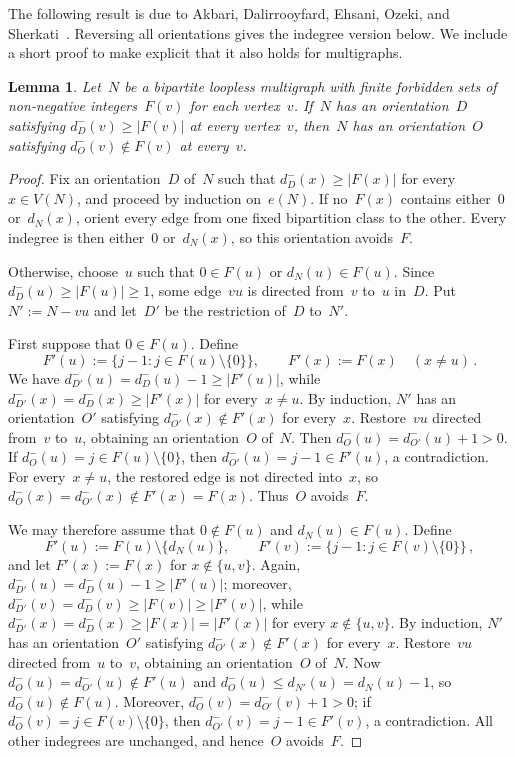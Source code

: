 \documentclass[12pt,reqno,a4paper]{amsart}
\newtheorem{lemma}[theorem]{Lemma}
\begin{document}
The following result is due to Akbari, Dalirrooyfard, Ehsani, Ozeki, and
Sherkati~\cite[Lemma~11 in the authors' preprint]{AkDaEhOzSh20}.
Reversing all orientations gives the indegree version below.
We include a short proof to make explicit that it also holds for multigraphs.

\begin{lemma}\label{lem:lists} 
  Let~$N$ be a bipartite loopless multigraph with finite forbidden sets of
  non-negative integers~$F(v)$ for each vertex~$v$.
  If~$N$ has an orientation~$D$ satisfying $d^-_D(v) \ge |F(v)|$ at every
  vertex~$v$, then~$N$ has an orientation~$O$ satisfying $d^-_O(v) \notin F(v)$
  at every~$v$.
\end{lemma}
\begin{proof}
  Fix an orientation~$D$ of~$N$ such that $d^-_D(x) \ge |F(x)|$ for every~$x
  \in V(N)$, and proceed by induction on~$e(N)$. 
  If no~$F(x)$ contains either~$0$ or~$d_N(x)$, orient every edge from one
  fixed bipartition class to the other. 
  Every indegree is then either~$0$ or~$d_N(x)$, so this orientation
  avoids~$F$.

  Otherwise, choose~$u$ such that $0 \in F(u)$ or $d_N(u) \in F(u)$. 
  Since $d^-_D(u) \ge |F(u)| \ge 1$, some edge~$vu$ is directed from~$v$ to~$u$
  in~$D$.
  Put $N' := N - vu$ and let~$D'$ be the restriction of~$D$ to~$N'$.

  First suppose that $0 \in F(u)$. 
  Define
  \[
    F'(u) := \{j-1 \colon j \in F(u) \setminus \{0\}\},
            \qquad F'(x) := F(x) \quad (x \neq u) \, .
  \]
  We have $d^-_{D'}(u) = d^-_D(u) - 1 \ge |F'(u)|$, while $d^-_{D'}(x) =
  d^-_D(x) \ge |F'(x)|$ for every~$x \neq u$.
  By induction, $N'$ has an orientation~$O'$ satisfying $d^-_{O'}(x) \notin
  F'(x)$ for every~$x$.
  Restore~$vu$ directed from~$v$ to~$u$, obtaining an orientation~$O$ of~$N$.
  Then $d^-_O(u) = d^-_{O'}(u) + 1 > 0$.
  If $d^-_O(u) = j \in F(u) \setminus \{0\}$, then $d^-_{O'}(u) = j-1 \in
  F'(u)$, a contradiction. 
  For every~$x \neq u$, the restored edge is not directed into~$x$, so
  $d^-_O(x) = d^-_{O'}(x) \notin F'(x) = F(x)$.
  Thus~$O$ avoids~$F$.

  We may therefore assume that $0 \notin F(u)$ and $d_N(u) \in F(u)$.
  Define
  \[
    F'(u) := F(u) \setminus \{d_N(u)\}, \qquad
    F'(v) := \{j-1 \colon j \in F(v) \setminus \{0\}\} \, ,
  \]
  and let $F'(x) := F(x)$ for $x \notin \{u,v\}$.
  Again, $d^-_{D'}(u) = d^-_D(u)-1 \ge |F'(u)|$; moreover, $d^-_{D'}(v) =
  d^-_D(v) \ge |F(v)| \ge |F'(v)|$, while $d^-_{D'}(x) = d^-_D(x) \ge |F(x)| =
  |F'(x)|$ for every $x \notin \{u,v\}$.
  By induction, $N'$ has an orientation~$O'$ satisfying $d^-_{O'}(x) \notin
  F'(x)$ for every~$x$.
  Restore~$vu$ directed from~$u$ to~$v$, obtaining an orientation~$O$ of~$N$.
  Now $d^-_O(u) = d^-_{O'}(u) \notin F'(u)$ and $d^-_O(u) \le d_{N'}(u) =
  d_N(u)-1$, so $d^-_O(u) \notin F(u)$.
  Moreover, $d^-_O(v) = d^-_{O'}(v) + 1 > 0$; if $d^-_O(v) = j \in F(v)
  \setminus \{0\}$, then $d^-_{O'}(v) = j-1 \in F'(v)$, a contradiction.
  All other indegrees are unchanged, and hence~$O$ avoids~$F$.
\end{proof}
\end{document}
